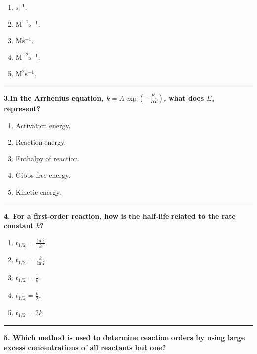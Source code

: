 \documentclass[
  9pt,
]{extbook}
\providecommand{\tightlist}{%
  \setlength{\itemsep}{0pt}\setlength{\parskip}{0pt}}
\theoremstyle{definition}
\theoremstyle{definition}
\theoremstyle{definition}
\theoremstyle{definition}
\theoremstyle{remark}
\begin{document}
\begin{enumerate}
\def\labelenumi{\alph{enumi}.}
\tightlist
\item
  \(\text{s}^{-1}\).
\item
  \(\text{M}^{-1}\text{s}^{-1}\).
\item
  \(\text{M}\text{s}^{-1}\).
\item
  \(\text{M}^{-2}\text{s}^{-1}\).
\item
  \(\text{M}^2\text{s}^{-1}\).
\end{enumerate}

\begin{center}\rule{0.5\linewidth}{0.5pt}\end{center}

\textbf{3.In the Arrhenius equation, \(k = A\exp(-\frac{E_a}{RT})\), what does \(E_a\) represent?}

\begin{enumerate}
\def\labelenumi{\alph{enumi}.}
\tightlist
\item
  Activation energy.
\item
  Reaction energy.
\item
  Enthalpy of reaction.
\item
  Gibbs free energy.
\item
  Kinetic energy.
\end{enumerate}

\begin{center}\rule{0.5\linewidth}{0.5pt}\end{center}

\textbf{4. For a first-order reaction, how is the half-life related to the rate constant \(k\)?}

\begin{enumerate}
\def\labelenumi{\alph{enumi}.}
\tightlist
\item
  \(t_{1/2} = \frac{\ln 2}{k}\).
\item
  \(t_{1/2} = \frac{k}{\ln 2}\).
\item
  \(t_{1/2} = \frac{1}{k}\).
\item
  \(t_{1/2} = \frac{k}{2}\).
\item
  \(t_{1/2} = 2k\).
\end{enumerate}

\begin{center}\rule{0.5\linewidth}{0.5pt}\end{center}

\textbf{5. Which method is used to determine reaction orders by using large excess concentrations of all reactants but one?}
\end{document}
